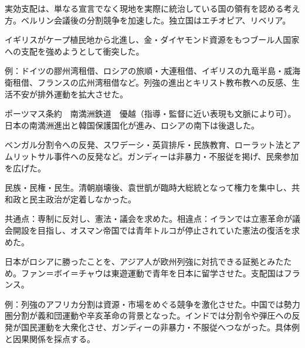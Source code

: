 \documentclass[dvipdfmx,a4paper,10pt]{jsarticle}
\begin{document}
実効支配は、単なる宣言でなく現地を実際に統治している国の領有を認める考え方。ベルリン会議後の分割競争を加速した。独立国はエチオピア、リベリア。

イギリスがケープ植民地から北進し、金・ダイヤモンド資源をもつブール人国家への支配を強めようとして衝突した。

例：ドイツの膠州湾租借、ロシアの旅順・大連租借、イギリスの九竜半島・威海衛租借、フランスの広州湾租借など。列強の進出とキリスト教布教への反感、生活不安が排外運動を拡大させた。

ポーツマス条約　南満洲鉄道　優越（指導・監督に近い表現も文脈により可）。日本の南満洲進出と韓国保護国化が進み、ロシアの南下は後退した。

ベンガル分割令への反発、スワデーシ・英貨排斥・民族教育、ローラット法とアムリットサル事件への反発など。ガンディーは非暴力・不服従を掲げ、民衆参加を広げた。

民族・民権・民生。清朝崩壊後、袁世凱が臨時大総統となって権力を集中し、共和政と民主政治が定着しなかった。

共通点：専制に反対し、憲法・議会を求めた。相違点：イランでは立憲革命が議会開設を目指し、オスマン帝国では青年トルコが停止されていた憲法の復活を求めた。

日本がロシアに勝ったことを、アジア人が欧州列強に対抗できる証拠とみたため。ファン＝ボイ＝チャウは東遊運動で青年を日本に留学させた。支配国はフランス。

例：列強のアフリカ分割は資源・市場をめぐる競争を激化させた。中国では勢力圏分割が義和団運動や辛亥革命の背景となった。インドでは分割令や弾圧への反発が国民運動を大衆化させ、ガンディーの非暴力・不服従へつながった。具体例と因果関係を採点する。
\end{document}
